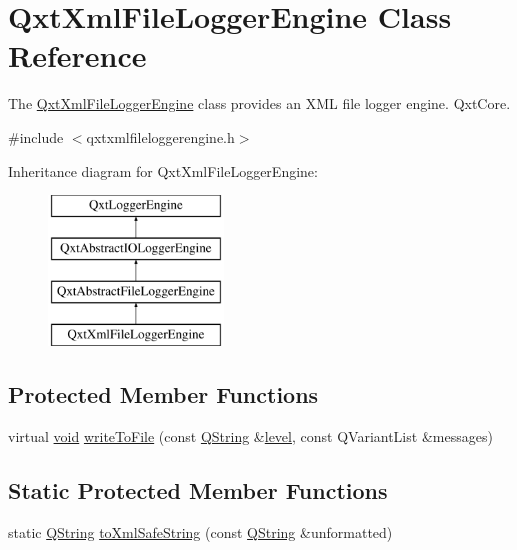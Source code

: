 \hypertarget{class_qxt_xml_file_logger_engine}{\section{Qxt\-Xml\-File\-Logger\-Engine Class Reference}
\label{class_qxt_xml_file_logger_engine}
}


The \hyperlink{class_qxt_xml_file_logger_engine}{Qxt\-Xml\-File\-Logger\-Engine} class provides an X\-M\-L file logger engine.  Qxt\-Core.  




{\ttfamily \#include $<$qxtxmlfileloggerengine.\-h$>$}

Inheritance diagram for Qxt\-Xml\-File\-Logger\-Engine\-:\begin{figure}[H]
\begin{center}
\leavevmode
\includegraphics[height=4.000000cm]{class_qxt_xml_file_logger_engine}
\end{center}
\end{figure}
\subsection*{Protected Member Functions}
\begin{DoxyCompactItemize}
\item 
virtual \hyperlink{group___u_a_v_objects_plugin_ga444cf2ff3f0ecbe028adce838d373f5c}{void} \hyperlink{class_qxt_xml_file_logger_engine_ada2720ff8af7ef7377e9245bd3f4f7fa}{write\-To\-File} (const \hyperlink{group___u_a_v_objects_plugin_gab9d252f49c333c94a72f97ce3105a32d}{Q\-String} \&\hyperlink{glext_8h_abc60a79088789bd61297bf5f9ff500d1}{level}, const Q\-Variant\-List \&messages)
\end{DoxyCompactItemize}
\subsection*{Static Protected Member Functions}
\begin{DoxyCompactItemize}
\item 
static \hyperlink{group___u_a_v_objects_plugin_gab9d252f49c333c94a72f97ce3105a32d}{Q\-String} \hyperlink{class_qxt_xml_file_logger_engine_a00c81a18fd0365ccdd0453bc24511e43}{to\-Xml\-Safe\-String} (const \hyperlink{group___u_a_v_objects_plugin_gab9d252f49c333c94a72f97ce3105a32d}{Q\-String} \&unformatted)
\end{DoxyCompactItemize}


